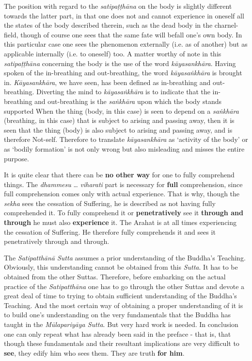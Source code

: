The position with regard to the \emph{satipaṭṭhāna} on the body is slightly different towards the latter part, in that one does not and cannot experience in oneself all the states of the body described therein, such as the dead body in the charnel-field, though of course one sees that the same fate will befall one's own body. In this particular case one sees the phenomenon externally (i.e. as of another) but as applicable internally (i.e. to oneself) too. A matter worthy of note in this \emph{satipaṭṭhāna} concerning the body is the use of the word \emph{kāyasankhāra}. Having spoken of the in-breathing and out-breathing, the word \emph{kāyasaṅkhāra} is brought in. \emph{Kāyasankhāra}, we have seen, has been defined as in-breathing and out-breathing. Diverting the mind to \emph{kāyasaṅkhāra} is to indicate that the in-breathing and out-breathing is the \emph{saṅkhāra} upon which the body stands supported When the thing (body, in this case) is seen to depend on a \emph{saṅkhāra} (breathing, in this case) that is subject to arising and passing away, then it is seen that the thing (body) is also subject to arising and passing away, and is therefore Not-self. Therefore to translate \emph{kāyasankhāra} as `activity of the body' or as `bodily formation' is not only wrong but also misleading and misses the entire purpose.

It is quite clear that there can be \textbf{no other way} for one to fully comprehend things. The \emph{dhammesu} \ldots\hspace{0pt} \emph{viharati} part is necessary for \textbf{full} comprehension, since full comprehension comes only with actual experience. That is why, though the \emph{sekha} sees the cessation of Suffering, he is described as not having fully comprehended it. To fully comprehend it or \textbf{penetratively} see it \textbf{through and through} he must also \textbf{experience} it. The Arahat is at all times experiencing the cessation of Suffering. He therefore fully comprehends it and sees it penetratively through and through.

\protect\hypertarget{truth-for-him}{}{}The \emph{Satipatthānā Sutta} assumes a prior understanding of the Buddha's Teaching. Obviously, this understanding cannot be obtained from this \emph{Sutta}. It has to be obtained from the other Suttas. Therefore, before embarking on the actual practice of the \emph{Satipatthāna} one has to go through the other Suttas and devote a great deal of time to trying to obtain sufficient understanding of the Buddha's Teaching. And the most certain way of obtaining a proper understanding of it is to build one's understanding on the very fundamentals that the Buddha has taught in the \emph{Mūlapariyāya Sutta}. But very hard work is needed. In conclusion one can only repeat what has already been said in the preface - that is, that though these fundamentals and their resultant implications are very difficult to \textbf{see}, they edify him who sees them. They are truth \textbf{for him}.
